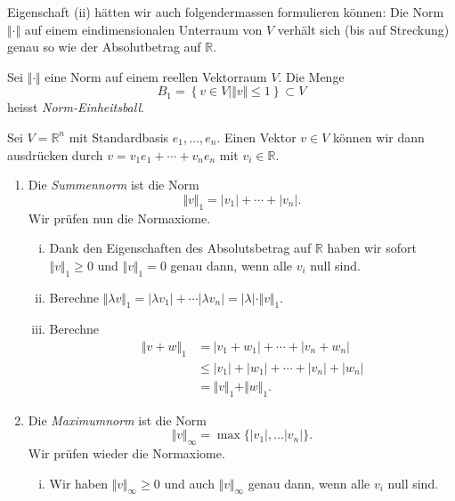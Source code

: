 \documentclass[../main.tex]{subfiles}
\begin{document}
Eigenschaft (ii) hätten wir auch folgendermassen formulieren können:
Die Norm $\Vert \cdot \Vert$ auf einem eindimensionalen Unterraum
von $V$ verhält sich (bis auf Streckung) genau so wie der Absolutbetrag
auf $\mathbb{R}$.

\begin{definition}
  Sei $\Vert \cdot \Vert$ eine Norm auf einem reellen Vektorraum $V$.
  Die Menge
  \[
    B_1 = \left\{v \in V \mid \Vert v \Vert \leq 1\right\} \subset V
  \]
  heisst \emph{Norm-Einheitsball}.
\end{definition}

\begin{examples}
  Sei $V = \mathbb{R}^n$ mit Standardbasis $e_1, \dots, e_n$.
  Einen Vektor $v \in V$ können wir dann ausdrücken durch
  $v = v_1 e_1 + \cdots + v_n e_n$ mit $v_i \in \mathbb{R}$.
  \begin{enumerate}[(1)]
    \item Die \emph{Summennorm} ist die Norm
      \[
        \Vert v \Vert_1 = |v_1| + \cdots + |v_n|.
      \]
      Wir prüfen nun die Normaxiome.
      \begin{enumerate}[(i)]
        \item Dank den Eigenschaften des
          Absolutsbetrag auf $\mathbb{R}$ haben wir sofort
          $\Vert v \Vert_1 \geq 0$
          und $\Vert v \Vert_1 = 0$ genau dann, wenn alle $v_i$ null sind.
        \item Berechne $\Vert \lambda v \Vert_1
          = |\lambda v_1| + \cdots |\lambda v_n| = |\lambda| \cdot
          \Vert v \Vert_1$.
        \item Berechne
          \begin{align*}
            \Vert v + w \Vert_1
            &= |v_1 + w_1| + \cdots + |v_n + w_n| \\
            & \leq |v_1| + |w_1| + \cdots + |v_n| + |w_n| \\
            &= \Vert v \Vert_1 + \Vert w \Vert_1.
          \end{align*}
      \end{enumerate}
    \item Die \emph{Maximumnorm}
      ist die Norm
      \[
        \Vert v \Vert_{\infty}
        = \max \{ |v_1|, \dots |v_n|\}.
      \]
      Wir prüfen wieder die Normaxiome.
      \begin{enumerate}[(i)]
        \item Wir haben $\Vert v \Vert_{\infty} \geq 0$
          und auch $\Vert v \Vert_{\infty}$ genau dann,
          wenn alle $v_i$ null sind.

\end{enumerate}
\end{enumerate}
\end{examples}
\end{document}
